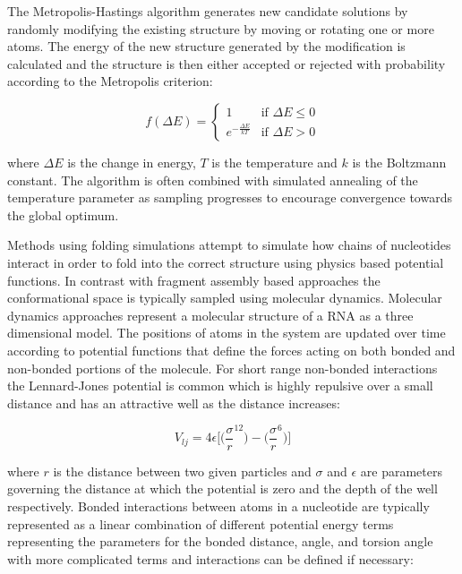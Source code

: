 \documentclass[journal]{IEEEtran}
\begin{document}
The Metropolis-Hastings algorithm generates new candidate solutions by randomly modifying the existing structure by moving or rotating one or more atoms. The energy of the new structure generated by the modification is calculated and the structure is then either accepted or rejected with probability according to the Metropolis criterion:

\begin{equation}
\label{eq:metropolis-criterion}
f(\Delta E) = 
  \begin{cases} 
    1 & \text{if } \Delta E \leq 0 \\
    e^{-\frac{\Delta E}{kT}} & \text{if } \Delta E > 0
  \end{cases}
\end{equation}

where $\Delta E$ is the change in energy, $T$ is the temperature and $k$ is the Boltzmann constant. The algorithm is often combined with simulated annealing of the temperature parameter as sampling progresses to encourage convergence towards the global optimum. 

Methods using folding simulations attempt to simulate how chains of nucleotides interact in order to fold into the correct structure using physics based potential functions. In contrast with fragment assembly based approaches the conformational space is typically sampled using molecular dynamics. Molecular dynamics approaches represent a molecular structure of a RNA as a three dimensional model. The positions of atoms in the system are updated over time according to potential functions that define the forces acting on both bonded and non-bonded portions of the molecule. For short range non-bonded interactions the Lennard-Jones potential is common which is highly repulsive over a small distance and has an attractive well as the distance increases:

\begin{equation}
\label{eq:lennard-jones}
	V_{lj} = 4\epsilon \bigg[ \bigg( \frac{\sigma}{r}^{12} \bigg) - \bigg( \frac{\sigma}{r}^6 \bigg) \bigg]
\end{equation}

where $r$ is the distance between two given particles and $\sigma$ and $\epsilon$ are parameters governing the distance at which the potential is zero and the depth of the well respectively. Bonded interactions between atoms in a nucleotide are typically represented as a linear combination of different potential energy terms representing the parameters for the bonded distance, angle, and torsion angle with more complicated terms and interactions can be defined if necessary:
\end{document}
